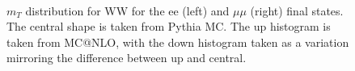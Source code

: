 \begin{figure}[!htbp]
\begin{center}
\\
\caption{$m_T$ distribution for WW for the ee (left) and $\mu\mu$ (right) final states. 
The central shape is taken from Pythia MC. The up histogram is taken from 
MC@NLO, with the down histogram taken as a variation mirroring the difference between up and central. 
}
\label{fig:wwsyst_hzz}
\end{center}
\end{figure}
